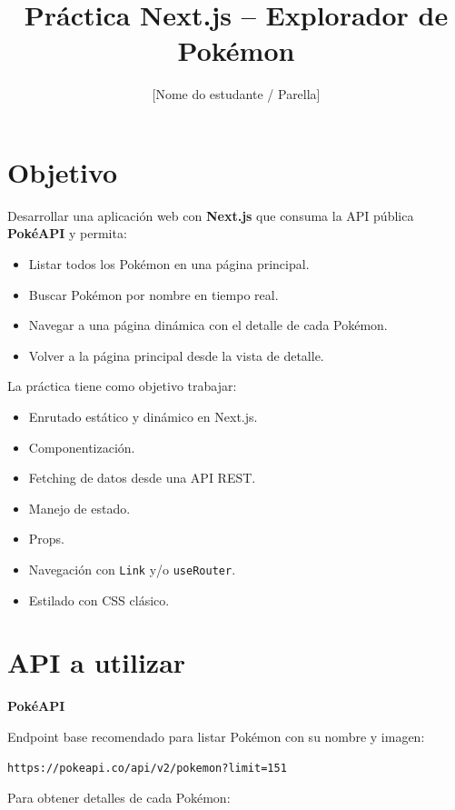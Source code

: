\documentclass[12pt,a4paper]{article}
\title{Práctica Next.js – Explorador de Pokémon}
\author{[Nome do estudante / Parella]}
\date{}
\begin{document}
\maketitle

\section*{Objetivo}

Desarrollar una aplicación web con \textbf{Next.js} que consuma la API pública \textbf{PokéAPI} y permita:

\begin{itemize}
    \item Listar todos los Pokémon en una página principal.
    \item Buscar Pokémon por nombre en tiempo real.
    \item Navegar a una página dinámica con el detalle de cada Pokémon.
    \item Volver a la página principal desde la vista de detalle.
\end{itemize}

La práctica tiene como objetivo trabajar:

\begin{itemize}
    \item Enrutado estático y dinámico en Next.js.
    \item Componentización.
    \item Fetching de datos desde una API REST.
    \item Manejo de estado.
    \item Props.
    \item Navegación con \texttt{Link} y/o \texttt{useRouter}.
    \item Estilado con CSS clásico.
\end{itemize}

\section*{API a utilizar}

\textbf{PokéAPI}

Endpoint base recomendado para listar Pokémon con su nombre y imagen:

\begin{verbatim}
https://pokeapi.co/api/v2/pokemon?limit=151
\end{verbatim}

Para obtener detalles de cada Pokémon:
\end{document}

